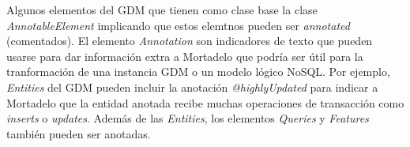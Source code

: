 Algunos elementos del GDM que tienen como clase base la clase \textit{AnnotableElement} implicando que estos elemtnos pueden ser \textit{annotated} (comentados). El elemento \textit{Annotation} son indicadores de texto que pueden usarse para dar información extra a Mortadelo que podría ser útil para la tranformación de una instancia GDM o un modelo lógico NoSQL. Por ejemplo, \textit{Entities} del GDM pueden incluir la anotación \textit{@highlyUpdated} para indicar a Mortadelo que la entidad anotada recibe muchas operaciones de transacción como \textit{inserts} o \textit{updates}. Además de las \textit{Entities}, los elementos \textit{Queries} y \textit{Features} también pueden ser anotadas.
